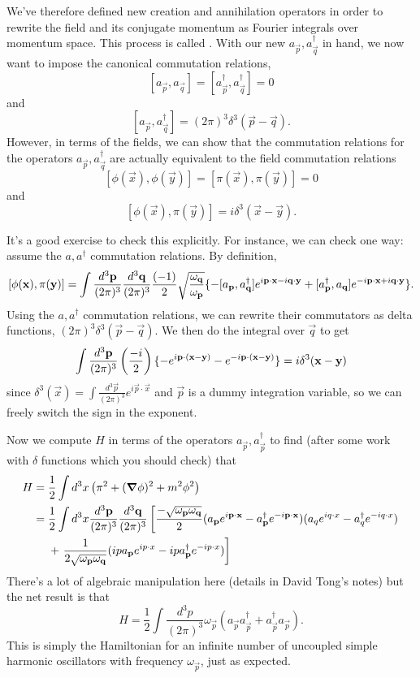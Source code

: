 We've therefore defined new creation and annihilation operators in order to rewrite the field and its conjugate momentum as Fourier integrals over momentum space. This process is called .
With our new $a_{\vec p},a^\dagger_{\vec q}$ in hand, we now want to impose the canonical commutation relations, $$[a_{\vec p},a_{\vec q}]=[a^\dagger_{\vec p}, a^\dagger_{\vec q}]=0$$ and $$[a_{\vec p}, a_{\vec q}^\dagger]=(2\pi)^3 \delta^3(\vec p -\vec q).$$
%
However, in terms of the fields, we can show that the commutation relations for the operators $a_{\vec p}, a_{\vec q}^\dagger$ are actually equivalent to the field commutation relations
$$[\phi(\vec x), \phi(\vec y)]= [\pi (\vec x), \pi (\vec y)]=0$$
and
$$[\phi(\vec x), \pi (\vec y)]=i\delta^3 (\vec x - \vec y).$$

It's a good exercise to check this explicitly. For instance, we can check one way: assume the $a, a^\dagger$ commutation relations. By definition,
$$[\phi(\boldsymbol{\mathbf{x}}),\pi(\boldsymbol{\mathbf{y}})]=\int \frac{d^3 \boldsymbol{\mathbf{p}}}{(2\pi)^3} \frac{d^3 \boldsymbol{\mathbf{q}}}{(2\pi)^3} \frac{(-1)}{2}\sqrt{\frac{\omega_{\boldsymbol{\mathbf{q}}}}{\omega_{\boldsymbol{\mathbf{p}}}}}\{ -[a_{\boldsymbol{\mathbf{p}}}, a_{\boldsymbol{\mathbf{q}}}^\dagger] e^{i\boldsymbol{\mathbf{p}} \cdot \boldsymbol{\mathbf{x}} - i\boldsymbol{\mathbf{q}} \cdot \boldsymbol{\mathbf{y}}}+[a_{\boldsymbol{\mathbf{p}}}^\dagger, a_{\boldsymbol{\mathbf{q}}}] e^{-i\boldsymbol{\mathbf{p}} \cdot \boldsymbol{\mathbf{x}} + i\boldsymbol{\mathbf{q}} \cdot \boldsymbol{\mathbf{y}}}\}.$$
Using the $a,a^\dagger$ commutation relations, we can rewrite their commutators as delta functions, $(2\pi)^3 \delta^3(\vec p-\vec q)$. We then do the integral over $\vec q$ to get 
$$\int \frac{d^3 \boldsymbol{\mathbf{p}}}{(2\pi)^3}\left(\frac{-i}{2}\right)\{-e^{i\boldsymbol{\mathbf{p}} \cdot (\boldsymbol{\mathbf{x}} - \boldsymbol{\mathbf{y}})}-e^{-i\boldsymbol{\mathbf{p}} \cdot (\boldsymbol{\mathbf{x}} - \boldsymbol{\mathbf{y}})}\}=i \delta^3 (\boldsymbol{\mathbf{x}} - \boldsymbol{\mathbf{y}})$$
since $\delta^3(\vec x)= \int \frac{d^3 \vec p}{(2\pi)^3} e^{i \vec p \cdot \vec x}$ and $\vec p$ is a dummy integration variable, so we can freely switch the sign in the exponent.

Now we compute $H$ in terms of the operators $a_{\vec p}, a_{\vec p}^\dagger$ to find (after some work with $\delta$ functions which you should check) that
\begin{align*}
H={}&\frac{1}{2}\int d^3 x \left( \pi^2+(\mbox{\boldmath$ \nabla $} \phi)^2+m^2\phi^2\right)\\
={}& \frac{1}{2}\int d^3x \frac{d^3 \boldsymbol{\mathbf{p}}}{(2\pi)^3} \frac{d^3 \boldsymbol{\mathbf{q}}}{(2\pi)^3} \left[ \frac{-\sqrt{\omega_{\boldsymbol{\mathbf{p}}}\omega_{\boldsymbol{\mathbf{q}}}}}{2}(a_{\boldsymbol{\mathbf{p}}} e^{i\boldsymbol{\mathbf{p}} \cdot \boldsymbol{\mathbf{x}}}-a^\dagger_{\boldsymbol{\mathbf{p}}} e^{-i \boldsymbol{\mathbf{p}} \cdot \boldsymbol{\mathbf{x}}})(a_q e^{iq \cdot x}-a_q^\dagger e^{-i q\cdot x})\right.\\
&+\left.\frac{1}{2\sqrt{\omega_{\boldsymbol{\mathbf{p}}}\omega_{\boldsymbol{\mathbf{q}}}}}(ip a_{\boldsymbol{\mathbf{p}}} e^{ip\cdot x}-ip a_{\boldsymbol{\mathbf{p}}}^\dagger e^{-i p\cdot x}) \right]
\end{align*}
There's a lot of algebraic manipulation here (details in David Tong's notes) but the net result is that
$$H=\frac{1}{2} \int \frac{d^3p}{(2\pi)^3} \omega_{\vec p}(a_{\vec p} a_{\vec p}^\dagger + a_{\vec p}^\dagger a_{\vec p}).$$
This is simply the Hamiltonian for an infinite number of uncoupled simple harmonic oscillators with frequency $\omega_{\vec p}$, just as expected.

